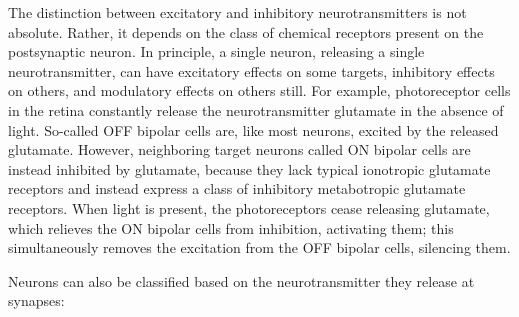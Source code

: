 The distinction between excitatory and inhibitory neurotransmitters is not absolute. Rather, it depends on the class of chemical receptors present on the postsynaptic neuron. In principle, a single neuron, releasing a single neurotransmitter, can have excitatory effects on some targets, inhibitory effects on others, and modulatory effects on others still. For example, photoreceptor cells in the retina constantly release the neurotransmitter glutamate in the absence of light. So-called OFF bipolar cells are, like most neurons, excited by the released glutamate. However, neighboring target neurons called ON bipolar cells are instead inhibited by glutamate, because they lack typical ionotropic glutamate receptors and instead express a class of inhibitory metabotropic glutamate receptors. When light is present, the photoreceptors cease releasing glutamate, which relieves the ON bipolar cells from inhibition, activating them; this simultaneously removes the excitation from the OFF bipolar cells, silencing them.

Neurons can also be classified based on the neurotransmitter they release at synapses:

